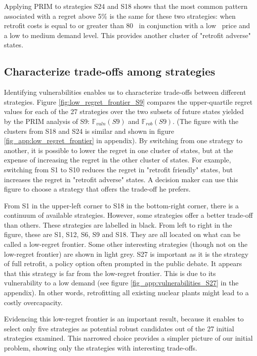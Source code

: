 Applying PRIM to strategies S24 and S18 shows that the most common pattern associated with a regret above 5\% is the same for these two strategies: when retrofit costs is equal to or greater than 80 \emwh\ in conjunction with a low \coo\ price and a low to medium demand level. This provides another cluster of "retrofit adverse" states.


\subsection{Characterize trade-offs among strategies}

Identifying vulnerabilities enables us to characterize trade-offs between different strategies. Figure \ref{fig:low_regret_frontier_S9} compares the upper-quartile regret values for each of the 27 strategies over the two subsets of future states yielded by the PRIM analysis of S9: $\mathbb{F}_{vuln}(S9)$ and $\mathbb{F}_{rob}(S9)$. (The figure with the clusters from S18 and S24 is similar and shown in figure \ref{fig_app:low_regret_frontier} in appendix).
By switching from one strategy to another, it is possible to lower the regret in one cluster of states, but at the expense of increasing the regret in the other cluster of states. For example, switching from S1 to S10 reduces the regret in "retrofit friendly" states, but increases the regret in "retrofit adverse" states. 
A decision maker can use this figure to choose a strategy that offers the trade-off he prefers. 

From S1 in the upper-left corner to S18 in the bottom-right corner, there is a continuum of available strategies. 
However, some strategies offer a better trade-off than others. 
These strategies are labelled in black. From left to right in the figure, these are S1, S12, S6, S9 and S18. 
They are all located on what can be called a low-regret frontier. 
Some other interesting strategies (though not on the low-regret frontier) are shown in light grey. 
S27 is important as it is the strategy of full retrofit, a policy option often prompted in the public debate. 
It appears that this strategy is far from the low-regret frontier. 
This is due to its vulnerability to a low demand (see figure \ref{fig_app:vulnerabilities_S27} in the appendix). In other words, retrofitting all existing nuclear plants might lead to a costly overcapacity.

Evidencing this low-regret frontier is an important result, because it enables to select only five strategies as potential robust candidates out of the 27 initial strategies examined. This narrowed choice provides a simpler picture of our initial problem, showing only the strategies with interesting trade-offs.

